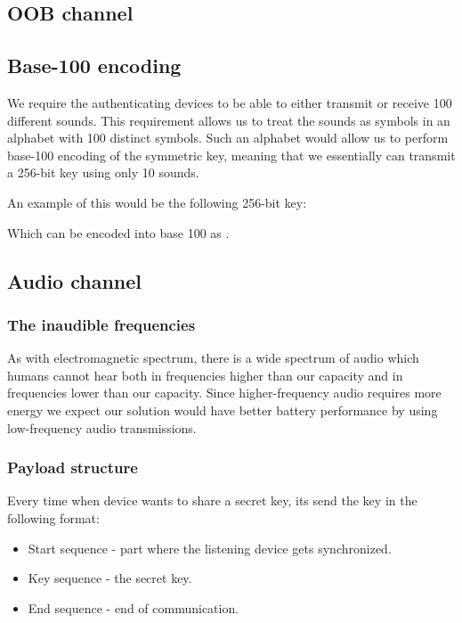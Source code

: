 \documentclass[12pt]{article}
\begin{document}
\subsection{OOB channel}

\subsection{Base-100 encoding}

We require the authenticating devices to be able to either transmit or receive 100 different sounds. This requirement allows us to treat the sounds as symbols in an alphabet with 100 distinct symbols. Such an alphabet would allow us to perform base-100 encoding of the symmetric key, meaning that we essentially can transmit a 256-bit key using only 10 sounds.

An example of this would be the following 256-bit key:


Which can be encoded into base 100 as .

\subsection{Audio channel}

\subsubsection{The inaudible frequencies}
\label{subs:The inaudible frequencies}

As with electromagnetic spectrum, there is a wide spectrum of audio which humans cannot hear both in frequencies higher than our capacity and in frequencies lower than our capacity. Since higher-frequency audio requires more energy we expect our solution would have better battery performance by using low-frequency audio transmissions.

\subsubsection{Payload structure}
Every time when device wants to share a secret key, its send the key in the following format:

\begin{itemize}
    \item Start sequence - part where the listening device gets synchronized.
    \item Key sequence - the secret key.
    \item End sequence - end of communication.
\end{itemize}
\end{document}
